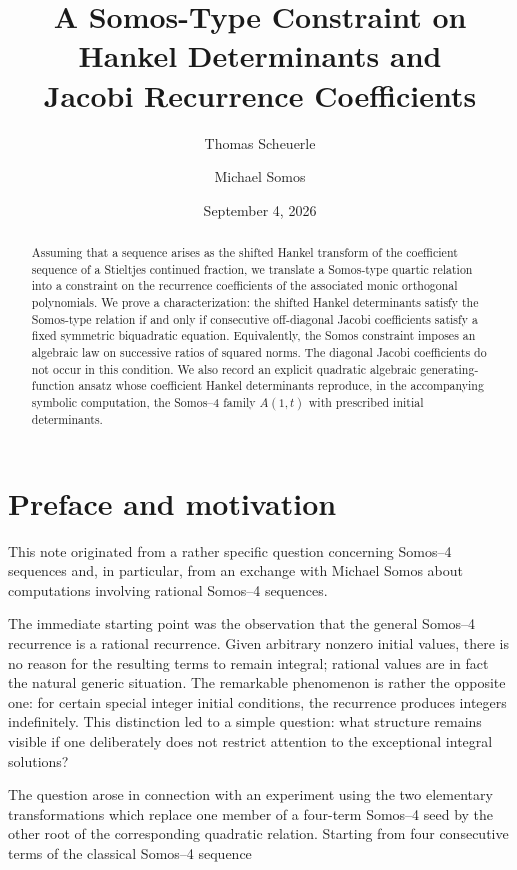 \documentclass[11pt]{article}
\title{A Somos-Type Constraint on Hankel Determinants and\\Jacobi Recurrence Coefficients}
\author{Thomas Scheuerle \and Michael Somos}
\date{September 4, 2026}
\theoremstyle{remark}
\begin{document}
\maketitle

\begin{abstract}
Assuming that a sequence arises as the shifted Hankel transform of the coefficient sequence of a Stieltjes continued fraction, we translate a Somos-type quartic relation into a constraint on the recurrence coefficients of the associated monic orthogonal polynomials. We prove a characterization: the shifted Hankel determinants satisfy the Somos-type relation if and only if consecutive off-diagonal Jacobi coefficients satisfy a fixed symmetric biquadratic equation. Equivalently, the Somos constraint imposes an algebraic law on successive ratios of squared norms. The diagonal Jacobi coefficients do not occur in this condition. We also record an explicit quadratic algebraic generating-function ansatz whose coefficient Hankel determinants reproduce, in the accompanying symbolic computation, the Somos--4 family $A(1,t)$ with prescribed initial determinants.  
\end{abstract}

\section*{Preface and motivation}

This note originated from a rather specific question concerning Somos--4 sequences and, in particular, from an exchange with Michael Somos about computations involving rational Somos--4 sequences.

The immediate starting point was the observation that the general Somos--4 recurrence is a rational recurrence. Given arbitrary nonzero initial values, there is no reason for the resulting terms to remain integral; rational values are in fact the natural generic situation. The remarkable phenomenon is rather the opposite one: for certain special integer initial conditions, the recurrence produces integers indefinitely. This distinction led to a simple question: what structure remains visible if one deliberately does not restrict attention to the exceptional integral solutions?

The question arose in connection with an experiment using the two elementary transformations which replace one member of a four-term Somos--4 seed by the other root of the corresponding quadratic relation. Starting from four consecutive terms of the classical Somos--4 sequence
\end{document}
